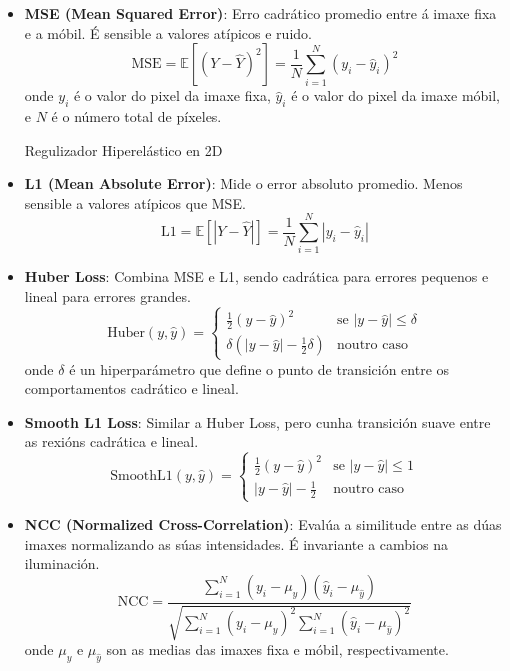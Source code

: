 \begin{itemize}
    \item \textbf{MSE (Mean Squared Error)}:
    Erro cadrático promedio entre á imaxe fixa e a móbil. É sensible a valores atípicos e ruido.
    \[
    \text{MSE} = \mathbb{E}[(Y - \hat{Y})^2] = \frac{1}{N} \sum_{i=1}^{N} (y_i - \hat{y}_i)^2
    \]
    onde \( y_i \) é o valor do pixel da imaxe fixa, \( \hat{y}_i \) é o valor do pixel da imaxe móbil, e \( N \) é o número total de píxeles. \cite{Palubinskas02012017}

    Regulizador Hiperelástico en 2D   \item \textbf{L1 (Mean Absolute Error)}:
    Mide o error absoluto promedio. Menos sensible a valores atípicos que MSE.
    \[
    \text{L1} = \mathbb{E}[|Y - \hat{Y}|] = \frac{1}{N} \sum_{i=1}^{N} |y_i - \hat{y}_i|
    \]

    \item \textbf{Huber Loss}:
    Combina MSE e L1, sendo cadrática para errores pequenos e lineal para errores grandes.
    \[
    \text{Huber}(y, \hat{y}) = \begin{cases}
    \frac{1}{2}(y - \hat{y})^2 & \text{se } |y - \hat{y}| \leq \delta \\
    \delta(|y - \hat{y}| - \frac{1}{2}\delta) & \text{noutro caso}
    \end{cases}
    \]
    onde \( \delta \) é un hiperparámetro que define o punto de transición entre os comportamentos cadrático e lineal.

    \item \textbf{Smooth L1 Loss}:
    Similar a Huber Loss, pero cunha transición suave entre as rexións cadrática e lineal.
    \[
    \text{SmoothL1}(y, \hat{y}) = \begin{cases}
    \frac{1}{2}(y - \hat{y})^2 & \text{se } |y - \hat{y}| \leq 1 \\
    |y - \hat{y}| - \frac{1}{2} & \text{noutro caso}
    \end{cases}
    \]

    \item \textbf{NCC (Normalized Cross-Correlation)}:
    Evalúa a similitude entre as dúas imaxes normalizando as súas intensidades. É invariante a cambios na iluminación.
    \[
    \text{NCC} = \frac{\sum_{i=1}^{N} (y_i - \mu_y)(\hat{y}_i - \mu_{\hat{y}})}{\sqrt{\sum_{i=1}^{N} (y_i - \mu_y)^2 \sum_{i=1}^{N} (\hat{y}_i - \mu_{\hat{y}})^2}}
    \]
    onde \( \mu_y \) e \( \mu_{\hat{y}} \) son as medias das imaxes fixa e móbil, respectivamente.


\end{itemize}
